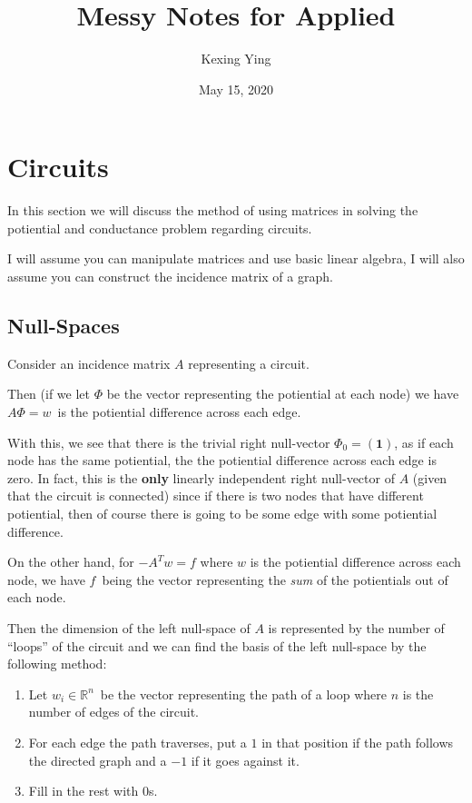 \documentclass[]{article}
\title{Messy Notes for Applied}
\author{Kexing Ying}
\date{May 15, 2020}
\begin{document}
\maketitle

{
\hypersetup{linkcolor=black}
\setcounter{tocdepth}{2}
\tableofcontents
}
\newpage

\section{Circuits}\label{circuits}

In this section we will discuss the method of using matrices in solving
the potiential and conductance problem regarding circuits.

I will assume you can manipulate matrices and use basic linear algebra,
I will also assume you can construct the incidence matrix of a graph.

\subsection{Null-Spaces}\label{null-spaces}

Consider an incidence matrix \(A\) representing a circuit.

Then (if we let \(\Phi\) be the vector representing the potiential at
each node) we have \(A \Phi = w\)~is the potiential difference across
each edge.

With this, we see that there is the trivial right null-vector
\(\Phi_0 = \left(\mathbf{1} \right)\), as if each node has the same
potiential, the the potiential difference across each edge is zero. In
fact, this is the \textbf{only} linearly independent right null-vector
of \(A\) (given that the circuit is connected) since if there is two
nodes that have different potiential, then of course there is going to
be some edge with some potiential difference.

On the other hand, for \(-A^T w = f\) where \(w\) is the potiential
difference across each node, we have \(f\)~being the vector representing
the \emph{sum} of the potientials out of each node.

Then the dimension of the left null-space of \(A\) is represented by the
number of ``loops'' of the circuit and we can find the basis of the left
null-space by the following method:

\begin{enumerate}
\def\labelenumi{\arabic{enumi}.}
\item
  Let \(w_i \in \mathbb{R}^n\)~be the vector representing the path of a
  loop where \(n\) is the number of edges of the circuit.
\item
  For each edge the path traverses, put a \(1\) in that position if the
  path follows the directed graph and a \(-1\) if it goes against it.
\item
  Fill in the rest with \(0\)s.
\end{enumerate}
\end{document}
